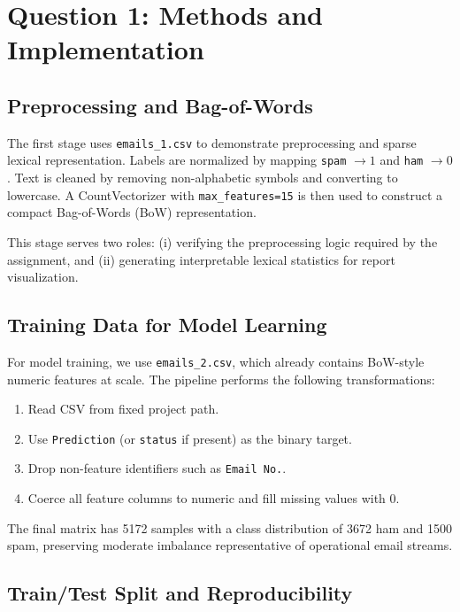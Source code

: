 \section{Question 1: Methods and Implementation}

\subsection{Preprocessing and Bag-of-Words}

The first stage uses \texttt{emails\_1.csv} to demonstrate preprocessing and sparse lexical representation. Labels are normalized by mapping \texttt{spam} $\rightarrow 1$ and \texttt{ham} $\rightarrow 0$. Text is cleaned by removing non-alphabetic symbols and converting to lowercase. A CountVectorizer with \texttt{max\_features=15} is then used to construct a compact Bag-of-Words (BoW) representation.

This stage serves two roles: (i) verifying the preprocessing logic required by the assignment, and (ii) generating interpretable lexical statistics for report visualization.

\subsection{Training Data for Model Learning}

For model training, we use \texttt{emails\_2.csv}, which already contains BoW-style numeric features at scale. The pipeline performs the following transformations:
\begin{enumerate}
    \item Read CSV from fixed project path.
    \item Use \texttt{Prediction} (or \texttt{status} if present) as the binary target.
    \item Drop non-feature identifiers such as \texttt{Email No.}.
    \item Coerce all feature columns to numeric and fill missing values with 0.
\end{enumerate}

The final matrix has 5172 samples with a class distribution of 3672 ham and 1500 spam, preserving moderate imbalance representative of operational email streams.

\subsection{Train/Test Split and Reproducibility}

